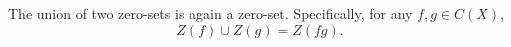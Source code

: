 The union of two zero-sets is again a zero-set. Specifically, for any $f, g \in C(X)$,
$$Z(f) \cup Z(g) = Z(fg).$$
